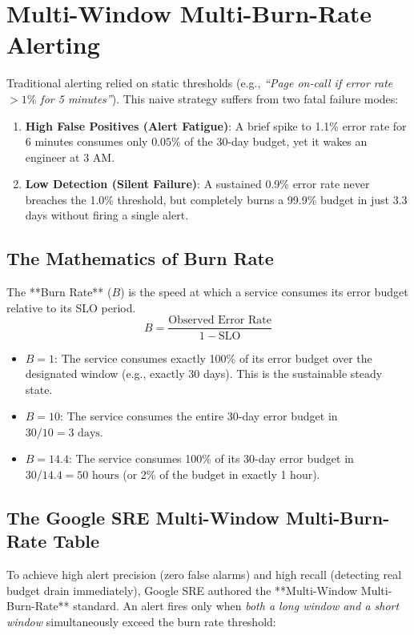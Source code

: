 \section{Multi-Window Multi-Burn-Rate Alerting}

Traditional alerting relied on static thresholds (e.g., \textit{``Page on-call if error rate $> 1\%$ for 5 minutes''}). This naive strategy suffers from two fatal failure modes:
\begin{enumerate}[leftmargin=18pt]
  \item \textbf{High False Positives (Alert Fatigue)}: A brief spike to 1.1\% error rate for 6 minutes consumes only $0.05\%$ of the 30-day budget, yet it wakes an engineer at 3 AM.
  \item \textbf{Low Detection (Silent Failure)}: A sustained 0.9\% error rate never breaches the 1.0\% threshold, but completely burns a 99.9\% budget in just 3.3 days without firing a single alert.
\end{enumerate}

\subsection{The Mathematics of Burn Rate}

The **Burn Rate** ($B$) is the speed at which a service consumes its error budget relative to its SLO period.
\begin{equation}
B = \frac{\text{Observed Error Rate}}{1 - \text{SLO}}
\end{equation}
\begin{itemize}[leftmargin=18pt]
  \item $B = 1$: The service consumes exactly 100\% of its error budget over the designated window (e.g., exactly 30 days). This is the sustainable steady state.
  \item $B = 10$: The service consumes the entire 30-day error budget in $30 / 10 = 3\text{ days}$.
  \item $B = 14.4$: The service consumes 100\% of its 30-day error budget in $30 / 14.4 = 50\text{ hours}$ (or 2\% of the budget in exactly 1 hour).
\end{itemize}

\subsection{The Google SRE Multi-Window Multi-Burn-Rate Table}

To achieve high alert precision (zero false alarms) and high recall (detecting real budget drain immediately), Google SRE authored the **Multi-Window Multi-Burn-Rate** standard. An alert fires only when \textit{both a long window and a short window} simultaneously exceed the burn rate threshold:

